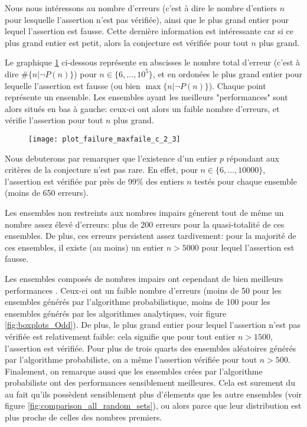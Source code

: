 \documentclass[../main.text]{report}
\begin{document}
Nous nous intéressons au nombre d'erreurs (c'est à dire le nombre d'entiers $n$ pour lesquelle l'assertion n'est pas vérifiée), ainsi que le plus grand entier pour lequel l'assertion est fausse. Cette dernière information est intéressante car si ce plus grand entier est petit, alors la conjecture est vérifiée pour tout $n$ plus grand.

Le graphique \ref{fig:failures_2_3} ci-dessous représente en abscisses le nombre total d'erreur (c'est à dire $\#\{n | \neg P(n)\}$) pour $n \in \{6,...,10^5\}$, et en ordonées le plus grand entier pour lequelle l'assertion est fausse (ou bien $\max \{n | \neg P(n)\}$). Chaque point représente un ensemble. Les ensembles ayant les meilleurs "performances" sont alors situés en bas à gauche: ceux-ci ont alors un faible nombre d'erreurs, et vérifie l'assertion pour tout $n$ plus grand. 

\begin{figure}[H]
\centering
\texttt{[image: plot\_failure\_maxfaile\_c\_2\_3]}
\caption{}
\label{fig:failures_2_3}
\end{figure}

Nous debuterons par remarquer que l'existence d'un entier $p$ répondant aux critères de la conjecture n'est pas rare. En effet, pour $ n \in \{6,...,10000\}$, l'assertion est vérifiée par près de 99\% des entiers $n$ testés pour chaque ensemble (moins de 650 erreurs). 

Les ensembles non restreints aux nombres impairs génerent tout de même un nombre assez élevé d'erreurs: plus de 200 erreurs pour la quasi-totalité de ces ensembles.
De plus, ces erreurs persistent assez tardivement: pour la majorité de ces ensembles, il existe (au moins) un entier $n > 5000$ pour lequel l'assertion est fausse. 


Les ensembles composés de nombres impairs ont cependant de bien meilleurs performances . Ceux-ci ont un faible nombre d'erreurs (moins de 50 pour les ensembles générés par l'algorithme probabilistique, moins de 100 pour les ensembles générés par les algorithmes analytiques, voir figure \ref{fig:boxplots_Odd}). 
De plus, le plus grand entier pour lequel l'assertion n'est pas vérifiée est relativement faible: cela signifie que pour tout entier $n > 1500$, l'assertion est vérifiée. Pour plus de trois quarts des ensembles aléatoires générés par l'algorithme probabiliste, on a même l'assertion vérifiée pour tout $n > 500$.
Finalement, on remarque aussi que les ensembles crées par l'algorithme probabiliste ont des performances sensiblement meilleures. Cela est surement du au fait qu'ils possèdent sensiblement plus d'élements que les autre ensembles (voir figure \ref{fig:comparison_all_random_sets}), ou alors parce que leur distribution est plus proche de celles des nombres premiers.
\end{document}
